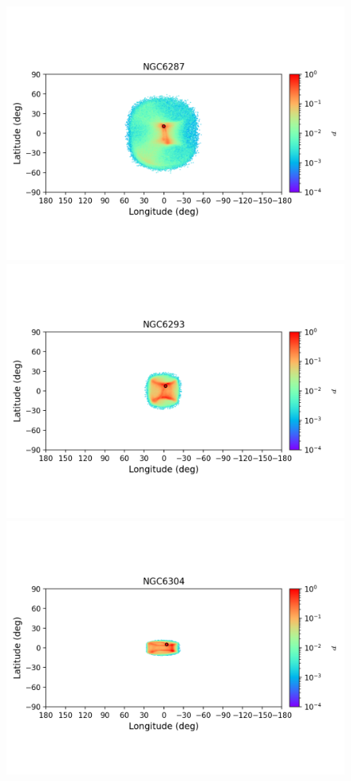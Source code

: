 \begin{figure}
        \includegraphics[clip=true, trim = 0mm 20mm 0mm 10mm, width=1\columnwidth]{images/error_plots_NGC6287.png}
        \includegraphics[clip=true, trim = 0mm 20mm 0mm 10mm, width=1\columnwidth]{images/error_plots_NGC6293.png}
        \includegraphics[clip=true, trim = 0mm 20mm 0mm 10mm, width=1\columnwidth]{images/error_plots_NGC6304.png}

\end{figure}

